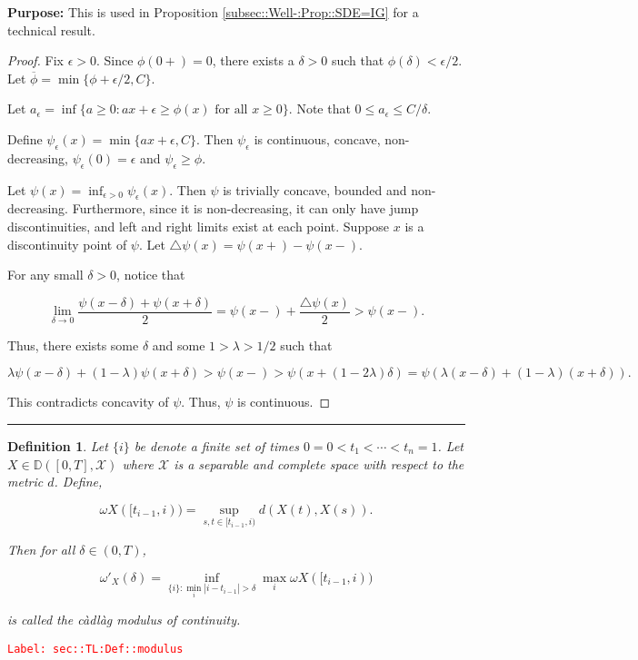 \documentclass[12pt]{article}
\newcommand{\mb}{\mathbb}
\newcommand{\mc}{\mathcal}
\newcommand{\ra}{\rightarrow}
\newcommand{\ov}{\overline}
\newcommand{\te}{\text}
\newcommand{\ep}{\epsilon}
\newcommand{\tr}{\textcolor{red}}
\newcommand{\labe}[1]{\tr{\texttt{Label: #1}}}
\newcommand{\purpose}{\textbf{Purpose: }}
\newcommand{\ind}{\hspace{24pt}}
\newcommand{\lin}{\rule{\linewidth}{0.4 pt}}
\newcommand{\cad}{\mb{D}}							%
\newcommand{\x}{x}								%
\renewcommand{\t}{t}							%
\renewcommand{\tt}{s}							%
\newcommand{\X}{X}								%
\newcommand{\tp}[1]{(#1)}						%
\newcommand{\rate}{\lambda}						%
\newcommand{\modu}{\omega}						%
\newcommand{\cmodu}{\omega'}					%
\newcommand{\pra}[1]{_{#1}}						%
\newcommand{\indx}[1]{_{#1}}					%
\newcommand{\spce}{\mc{X}}						%
\newtheorem{defn}[thms]{Definition}
\begin{document}
\purpose This is used in Proposition \ref{subsec::Well-:Prop::SDE=IG} for a technical result.

\begin{proof}
Fix \(\ep > 0\). Since \(\phi(0+) = 0\), there exists a \(\delta > 0\) such that \(\phi(\delta) < \ep/2\). Let \(\ov{\phi} = \min\{\phi+\ep/2, C\}\).

\ind Let \(a_\ep = \inf\{a \geq 0: a\x + \ep \geq \phi(\x)\te{ for all } \x\geq 0\}\). Note that \(0\leq a_\ep \leq C/\delta\). 

\ind Define \(\psi_\ep(\x) = \min\{a\x+\ep,C\}\). Then \(\psi_\ep\) is continuous, concave, non-decreasing, \(\psi_\ep(0) = \ep\) and \(\psi_\ep \geq \phi\).

\ind Let \(\psi(\x) = \inf_{\ep > 0} \psi_\ep(\x)\). Then \(\psi\) is trivially concave, bounded and non-decreasing. Furthermore, since it is non-decreasing, it can only have jump discontinuities, and left and right limits exist at each point. Suppose \(\x\) is a discontinuity point of \(\psi\). Let \(\triangle\psi(\x) = \psi(\x+) - \psi(\x-)\).

For any small \(\delta > 0\), notice that

\[\lim_{\delta \ra 0} \frac{\psi(\x-\delta) + \psi(\x+\delta)}{2} = \psi(\x-) + \frac{\triangle\psi(\x)}{2} > \psi(\x-).\]

Thus, there exists some \(\delta\) and some \(1>\rate>1/2\) such that

\[\rate\psi(\x-\delta) + (1 -\rate)\psi(\x+\delta) > \psi(\x-) > \psi(\x + (1 - 2\rate)\delta) = \psi\left(\rate(\x-\delta) + (1 - \rate)(\x+\delta)\right).\]

This contradicts concavity of \(\psi\). Thus, \(\psi\) is continuous.
\end{proof}

\lin

\begin{defn}
Let \(\{	{i}\}\) be denote a finite set of times \(0=	{0} <\t\indx{1} <\cdots < \t\indx{n}=1\). Let \(\X\in \cad([0,T],\spce)\) where \(\spce\) is a separable and complete space with respect to the metric \(d\). Define,

\[\modu{\X}([\t\indx{i-1},	{i})) = \sup_{\tt,\t\in [\t\indx{i-1},	{i})} d(\X\tp{\t},\X\tp{\tt}).\]

Then for all \(\delta \in (0,T)\),

\[\cmodu\pra{\X}(\delta) = \inf_{\{	{i}\}: \min_i |	{i} - \t\indx{i-1}| > \delta} \max_{i} \modu{\X}([\t\indx{i-1},	{i}))\]

is called the c\`adl\`ag modulus of continuity.
\label{sec::TL:Def::modulus}
\end{defn}
\labe{sec::TL:Def::modulus}
\end{document}
